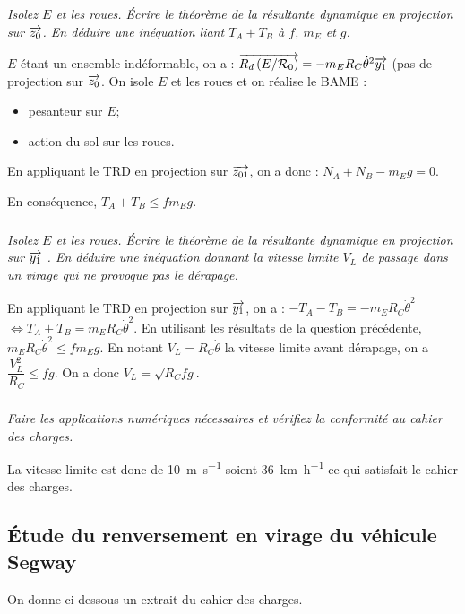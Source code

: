 \documentclass[10pt,fleqn]{article} %
\begin{document}
\begin{multicols}{2}
\subparagraph{}\textit{Isolez $E$ et les roues. Écrire le théorème de la résultante dynamique en projection sur $\overrightarrow{z_0}$. En déduire une inéquation liant $T_A + T_B$ à $f$, $m_E$ et $g$.}
\ifprof
\begin{corrige}
$E$ étant un ensemble indéformable, on a : $\overrightarrow{R_d \left( {E}/ {\mathcal{R}_{0}}\right)}=-m_E R_C\dot{\theta}^2\overrightarrow{y_1}$ (pas de projection sur $\overrightarrow{z_0}$. 
On isole $E$ et les roues  et on réalise le BAME : 
\begin{itemize}
\item pesanteur sur $E$;
\item action du sol sur les roues.
\end{itemize}

En appliquant le TRD en projection sur $\overrightarrow{z_{01}}$, on a donc :
$N_A+N_B-m_E g = 0$. 

En conséquence, $T_A+T_B\leq fm_E g $.

\end{corrige}
\else
\fi

\subparagraph{}\textit{Isolez $E$ et les roues. Écrire le théorème de la résultante dynamique en projection sur $\overrightarrow{y_1}$ . En déduire une inéquation donnant la vitesse limite $V_L$ de passage dans un virage qui ne provoque pas le dérapage.}
\ifprof

\begin{corrige}
En appliquant le TRD en projection sur $\overrightarrow{y_{1}}$, on a : $-T_A-T_B = -m_E R_C\dot{\theta}^2$ $\Leftrightarrow T_A+T_B = m_E R_C\dot{\theta}^2$. En utilisant les résultats de la question précédente, $m_E R_C\dot{\theta}^2 \leq fm_E g $. En notant $V_L=R_C\dot{\theta}$ la vitesse limite avant dérapage, on a $ \dfrac{V_L^2}{R_C} \leq f  g $.
On a donc $V_L=\sqrt{R_Cfg}$.
\end{corrige}
\else
\fi



\subparagraph{}\textit{Faire les applications numériques nécessaires et vérifiez la conformité au cahier des charges.}
\ifprof
\begin{corrige}
La vitesse limite est donc de \SI{10}{m.s^{-1}} soient \SI{36}{km.h^{-1}} ce qui satisfait le cahier des charges. 
\end{corrige}
\else
\fi
\subsection*{Étude du renversement en virage du véhicule Segway}
\ifprof
\else
On donne ci-dessous un extrait du cahier des charges.


\end{multicols}
\end{document}
